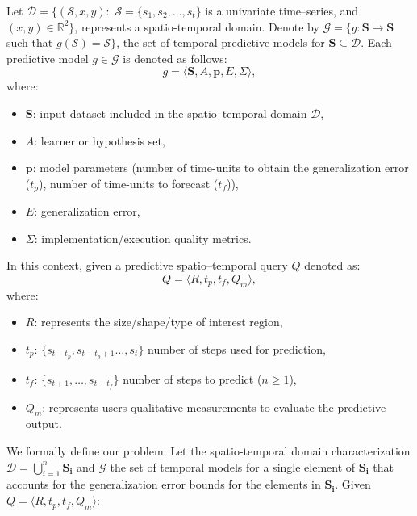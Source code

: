Let $\mathcal{D} = \{(\mathcal{S}, x, y): \,\, \mathcal{S} = \{s_{1}, s_{2}, \ldots, s_{t}\}$ is a univariate time--series, and $(x,y) \in \mathbb{R}^{2}\}$, represents a spatio-temporal domain. Denote by $\mathcal{G} = \{g: \mathbf{S} \to \mathbf{S}$ such that $g(\mathcal{S}) = \mathcal{S}\}$, the set of temporal predictive models for $\mathbf{S} \subseteq \mathcal{D}$. Each predictive model $g\in \mathcal{G}$ is denoted as follows:
\begin{equation}
\label{eq:ModelDefinition}
g = \langle \mathbf{S}, A, \mathbf{p}, E, \varSigma \rangle,
\end{equation}
where:
\begin{itemize}[noitemsep,nolistsep]	
	\item $\mathbf{S}$: input dataset included in the spatio--temporal domain $\mathcal{D}$,
	\item $A$: learner or hypothesis set,
	\item $\mathbf{p}$: model parameters (number of time-units to obtain the generalization error ($t_{p}$), number of time-units to forecast ($t_{f}$)),
	\item $E$: generalization error,
	\item $\varSigma$: implementation/execution quality metrics.
\end{itemize}

\noindent In this context, given a predictive spatio--temporal query $Q$ denoted as:
\begin{equation} \label{eq:predictivequery}
Q = \langle R, t_{p}, t_{f}, Q_{m} \rangle,
\end{equation}
where:
\begin{itemize}[noitemsep,nolistsep]	
	\item $R$: represents the size/shape/type of interest region,
	\item $t_{p}$: $\{s_{t-t_p}, s_{t-t_{p}+1}\ldots, s_{t}\}$ number of steps used for  prediction,
	\item $t_{f}$: $\{s_{t+1}, \ldots, s_{t+t_f}\}$ number of steps to predict ($n\geq 1$),
	\item $Q_{m}$: represents users qualitative measurements to evaluate the predictive output.
\end{itemize}

We formally define our problem: Let the spatio-temporal domain characterization $\mathcal{D} = \bigcup_{i=1}^{n} \mathbf{S_i}$ and $\mathcal{G}$ the set of temporal models for a single element of $\mathbf{S_i}$ that accounts for the generalization error bounds for the elements in $\mathbf{S_i}$. Given $Q = \langle R, t_{p}, t_{f}, Q_{m} \rangle$:

